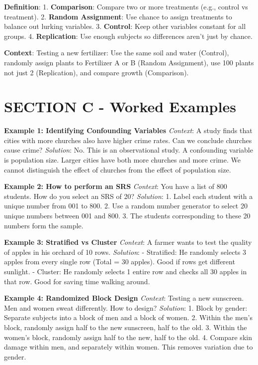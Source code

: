 \begin{lessonbox}
\textbf{Definition}: 
1. \textbf{Comparison}: Compare two or more treatments (e.g., control vs treatment).
2. \textbf{Random Assignment}: Use chance to assign treatments to balance out lurking variables.
3. \textbf{Control}: Keep other variables constant for all groups.
4. \textbf{Replication}: Use enough subjects so differences aren't just by chance.

\textbf{Context}: Testing a new fertilizer: Use the same soil and water (Control), randomly assign plants to Fertilizer A or B (Random Assignment), use 100 plants not just 2 (Replication), and compare growth (Comparison).
\end{lessonbox}

\section{SECTION C - Worked Examples}

\textbf{Example 1: Identifying Confounding Variables}
\textit{Context}: A study finds that cities with more churches also have higher crime rates. Can we conclude churches cause crime?
\textit{Solution}:
No. This is an observational study. A confounding variable is population size. Larger cities have both more churches and more crime. We cannot distinguish the effect of churches from the effect of population size.

\textbf{Example 2: How to perform an SRS}
\textit{Context}: You have a list of 800 students. How do you select an SRS of 20?
\textit{Solution}:
1. Label each student with a unique number from 001 to 800.
2. Use a random number generator to select 20 unique numbers between 001 and 800.
3. The students corresponding to these 20 numbers form the sample.

\textbf{Example 3: Stratified vs Cluster}
\textit{Context}: A farmer wants to test the quality of apples in his orchard of 10 rows. 
\textit{Solution}:
- Stratified: He randomly selects 3 apples from every single row (Total = 30 apples). Good if rows get different sunlight.
- Cluster: He randomly selects 1 entire row and checks all 30 apples in that row. Good for saving time walking around.

\textbf{Example 4: Randomized Block Design}
\textit{Context}: Testing a new sunscreen. Men and women sweat differently. How to design?
\textit{Solution}:
1. Block by gender: Separate subjects into a block of men and a block of women.
2. Within the men's block, randomly assign half to the new sunscreen, half to the old.
3. Within the women's block, randomly assign half to the new, half to the old.
4. Compare skin damage within men, and separately within women. This removes variation due to gender.

